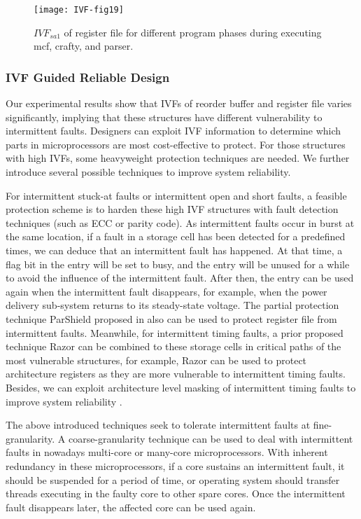 \begin{figure}[t]
    \centering
    \texttt{[image: IVF-fig19]}\\
    \caption{$IVF_{sa1}$ of register file for different program phases during executing mcf, crafty, and parser.}
    \label{fig:RF-IVF-sa1}
\end{figure}


\subsubsection{IVF Guided Reliable Design}
Our experimental results show that IVFs of reorder buffer and register file varies significantly, implying that these structures have different vulnerability to intermittent faults. Designers can exploit IVF information to determine which parts in microprocessors are most cost-effective to protect. For those structures with high IVFs, some heavyweight protection techniques are needed. We further introduce several possible techniques to improve system reliability.

For intermittent stuck-at faults or intermittent open and short faults, a feasible protection scheme is to harden these high IVF structures with fault detection techniques (such as ECC or parity code). As intermittent faults occur in burst at the same location, if a fault in a storage cell has been detected for a predefined times, we can deduce that an intermittent fault has happened. At that time, a flag bit in the entry will be set to busy, and the entry will be unused for a while to avoid the influence of the intermittent fault. After then, the entry can be used again when the intermittent fault disappears, for example, when the power delivery sub-system returns to its steady-state voltage. The partial protection technique ParShield proposed in \cite{montesinos2007using} also can be used to protect register file from intermittent faults. Meanwhile, for intermittent timing faults, a prior proposed technique Razor \cite{Dan_Micro03} can be combined to these storage cells in critical paths of the most vulnerable structures, for example, Razor can be used to protect architecture registers as they are more vulnerable to intermittent timing faults. Besides, we can exploit architecture level masking of intermittent timing faults to improve system reliability \cite{pan2011cost}.

The above introduced techniques seek to tolerate intermittent faults at fine-granularity. A coarse-granularity technique can be used to deal with intermittent faults in nowadays multi-core or many-core microprocessors. With inherent redundancy in these microprocessors, if a core sustains an intermittent fault, it should be suspended for a period of time, or operating system should transfer threads executing in the faulty core to other spare cores. Once the intermittent fault disappears later, the affected core can be used again.

